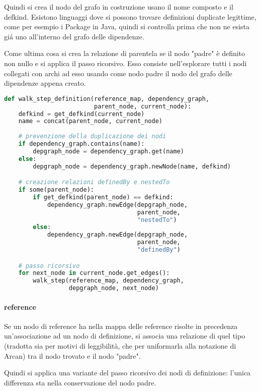 Quindi si crea il nodo del grafo in costruzione usano il nome composto e il defkind. Esistono linguaggi dove si possono trovare definizioni duplicate legittime, come per esempio i Package in Java, quindi si controlla prima che non ne esista gi\'a uno all'interno del grafo delle dipendenze.

Come ultima cosa si crea la relazione di parentela se il nodo "padre" \`e definito non nullo e si applica il passo ricorsivo.
Esso consiste nell'esplorare tutti i nodi collegati con archi ad esso usando come nodo padre il nodo del grafo delle dipendenze appena creato.

\begin{lstlisting}[language=Python, caption=pseudocodice]
def walk_step_definition(reference_map, dependency_graph,
                         parent_node, current_node):
    defkind = get_defkind(current_node)
    name = concat(parent_node, current_node)
    
    # prevenzione della duplicazione dei nodi
    if dependency_graph.contains(name):
        depgraph_node = dependency_graph.get(name)
    else:
        depgraph_node = dependency_graph.newNode(name, defkind)

    # creazione relazioni definedBy e nestedTo
    if some(parent_node):
        if get_defkind(parent_node) == defkind:
            dependency_graph.newEdge(depgraph_node,
                                     parent_node,
                                     "nestedTo")
        else:
            dependency_graph.newEdge(depgraph_node,
                                     parent_node,
                                     "definedBy")

    # passo ricorsivo
    for next_node in current_node.get_edges():
        walk_step(reference_map, dependency_graph,
                  depgraph_node, next_node)
\end{lstlisting}

\paragraph{reference}

Se un nodo di reference ha nella mappa delle reference risolte in precedenza un'associazione ad un nodo di definizione, si associa una relazione di quel tipo (tradotta sia per motivi di leggibilit\`a, che per uniformarla alla notazione di Arcan) tra il nodo trovato e il nodo "padre".

Quindi si applica una variante del passo ricorsivo dei nodi di definizione: l'unica differenza sta nella conservazione del nodo padre.

